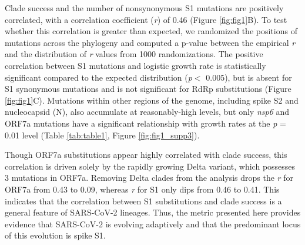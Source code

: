 \documentclass[12pt, letterpaper]{article}
\begin{document}
Clade success and the number of nonsynonymous S1 mutations are positively correlated, with a correlation coefficient (\emph{r}) of 0.46 (Figure \ref{fig:fig1}B). To test whether this correlation is greater than expected, we randomized the positions of mutations across the phylogeny and computed a p-value between the empirical \emph{r} and the distribution of \emph{r} values from 1000 randomizations. The positive correlation between S1 mutations and logistic growth rate is statistically significant compared to the expected distribution (\emph{p}$<$ 0.005), but is absent for S1 synonymous mutations and is not significant for RdRp substitutions (Figure \ref{fig:fig1}C). Mutations within other regions of the genome, including spike S2 and nucleocapsid (N), also accumulate at reasonably-high levels, but only \emph{nsp6} and ORF7a mutations have a significant relationship with growth rates at the \emph{p} = 0.01 level (Table \ref{tab:table1}, Figure \ref{fig:fig1_supp3}).

Though ORF7a substitutions appear highly correlated with clade success, this correlation is driven solely by the rapidly growing Delta variant, which possesses 3 mutations in ORF7a. Removing Delta clades from the analysis drops the \emph{r} for ORF7a from 0.43 to 0.09, whereas \emph{r} for S1 only dips from 0.46 to 0.41. This indicates that the correlation between S1 substitutions and clade success is a general feature of SARS-CoV-2 lineages. Thus, the metric presented here provides evidence that SARS-CoV-2 is evolving adaptively and that the predominant locus of this evolution is spike S1.
\end{document}
